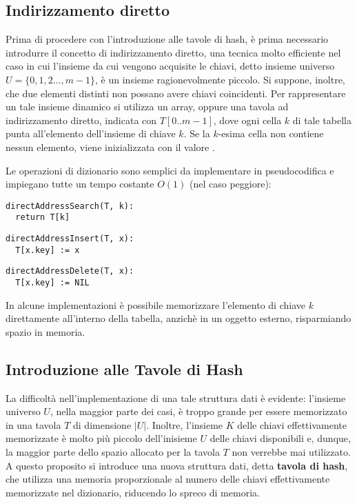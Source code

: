\subsection{Indirizzamento diretto}
Prima di procedere con l'introduzione alle tavole di hash, è prima necessario introdurre il concetto di indirizzamento diretto, una tecnica molto efficiente nel caso in cui l'insieme da cui vengono acquisite le chiavi, detto insieme universo \(U = \{0,1,2...,m-1\}\), è un insieme ragionevolmente piccolo. Si suppone, inoltre, che due elementi distinti non possano avere chiavi coincidenti. Per rappresentare un tale insieme dinamico si utilizza un array, oppure una tavola ad indirizzamento diretto, indicata con \(T[0..m-1]\), dove ogni cella \(k\) di tale tabella punta all'elemento dell'insieme di chiave \(k\). Se la \(k\)-esima cella non contiene nessun elemento, viene inizializzata con il valore .

Le operazioni di dizionario sono semplici da implementare in pseudocodifica e impiegano tutte un tempo costante \(O(1)\) (nel caso peggiore):

\begin{lstlisting}
directAddressSearch(T, k):
  return T[k]
\end{lstlisting}

\begin{lstlisting}
directAddressInsert(T, x):
  T[x.key] := x 
\end{lstlisting}

\begin{lstlisting}
directAddressDelete(T, x):
  T[x.key] := NIL
\end{lstlisting}

In alcune implementazioni è possibile memorizzare l'elemento di chiave \(k\) direttamente all'interno della tabella, anzichè in un oggetto esterno, risparmiando spazio in memoria. 

\subsection{Introduzione alle Tavole di Hash}

La difficoltà nell'implementazione di una tale struttura dati è evidente: l'insieme universo \(U\), nella maggior parte dei casi, è troppo grande per essere memorizzato in una tavola \(T\) di dimensione \(|U|\). Inoltre, l'insieme \(K\) delle chiavi effettivamente memorizzate è molto più piccolo dell'inisieme \(U\) delle chiavi disponibili e, dunque, la maggior parte dello spazio allocato per la tavola \(T\) non verrebbe mai utilizzato. A questo proposito si introduce una nuova struttura dati, detta \textbf{tavola di hash}, che utilizza una memoria proporzionale al numero delle chiavi effettivamente memorizzate nel dizionario, riducendo lo spreco di memoria. 

